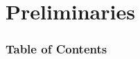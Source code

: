 \documentclass[
	11pt,
]{beamer}
\begin{document}

\section{Preliminaries} %
\begin{frame}
	\frametitle{Table of Contents}

	\tableofcontents[currentsection]
\end{frame}
\end{document}
